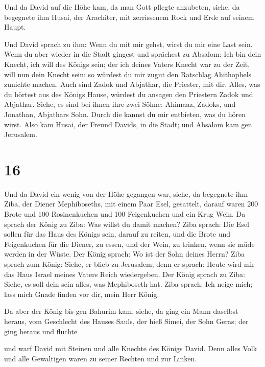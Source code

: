  Und da David auf die Höhe kam, da man Gott pflegte
anzubeten, siehe, da begegnete ihm Husai, der Arachiter, mit zerrissenem
Rock und Erde auf seinem Haupt.

 Und David sprach zu ihm: Wenn du mit mir gehst, wirst du
mir eine Last sein.  Wenn du aber wieder in die Stadt
gingest und sprächest zu Absalom: Ich bin dein Knecht, ich will des
Königs sein; der ich deines Vaters Knecht war zu der Zeit, will nun dein
Knecht sein: so würdest du mir zugut den Ratschlag Ahithophels zunichte
machen.  Auch sind Zadok und Abjathar, die Priester, mit
dir. Alles, was du hörtest aus des Königs Hause, würdest du ansagen den
Priestern Zadok und Abjathar.  Siehe, es sind bei ihnen
ihre zwei Söhne: Ahimaaz, Zadoks, und Jonathan, Abjathars Sohn. Durch
die kannst du mir entbieten, was du hören wirst.  Also
kam Husai, der Freund Davids, in die Stadt; und Absalom kam gen
Jerusalem.

\hypertarget{section-15}{%
\section{16}\label{section-15}}

 Und da David ein wenig von der Höhe gegangen war, siehe,
da begegnete ihm Ziba, der Diener Mephiboseths, mit einem Paar Esel,
gesattelt, darauf waren 200 Brote und 100 Rosinenkuchen und 100
Feigenkuchen und ein Krug Wein.  Da sprach der König zu
Ziba: Was willst du damit machen? Ziba sprach: Die Esel sollen für das
Haus des Königs sein, darauf zu reiten, und die Brote und Feigenkuchen
für die Diener, zu essen, und der Wein, zu trinken, wenn sie müde werden
in der Wüste.  Der König sprach: Wo ist der Sohn deines
Herrn? Ziba sprach zum König: Siehe, er blieb zu Jerusalem; denn er
sprach: Heute wird mir das Haus Israel meines Vaters Reich wiedergeben.
 Der König sprach zu Ziba: Siehe, es soll dein sein alles,
was Mephiboseth hat. Ziba sprach: Ich neige mich; lass mich Gnade finden
vor dir, mein Herr König.

 Da aber der König bis gen Bahurim kam, siehe, da ging ein
Mann daselbst heraus, vom Geschlecht des Hauses Sauls, der hieß Simei,
der Sohn Geras; der ging heraus und fluchte

 und warf David mit Steinen und alle Knechte des Königs
David. Denn alles Volk und alle Gewaltigen waren zu seiner Rechten und
zur Linken.

